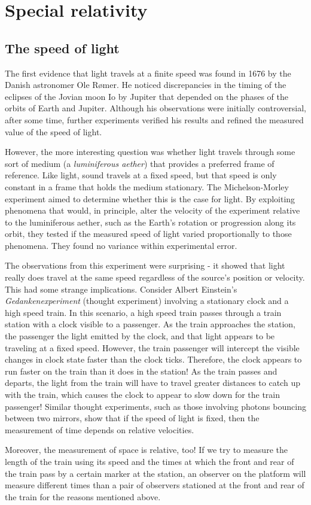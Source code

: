 \chapter{Special relativity}

\section{The speed of light}

The first evidence that light travels at a finite speed was found in 1676 by the Danish astronomer
Ole Rømer. He noticed discrepancies in the timing of the eclipses of the Jovian moon Io by Jupiter
that depended on the phases of the orbits of Earth and Jupiter. Although his observations were
initially controversial, after some time, further experiments verified his results and refined the
measured value of the speed of light.

However, the more interesting question was whether light travels through some sort of medium (a
\textit{luminiferous aether}) that provides a preferred frame of reference. Like light, sound
travels at a fixed speed, but that speed is only constant in a frame that holds the medium
stationary. The Michelson-Morley experiment aimed to determine whether this is the case for light.
By exploiting phenomena that would, in principle, alter the velocity of the experiment relative to
the luminiferous aether, such as the Earth's rotation or progression along its orbit, they tested
if the measured speed of light varied proportionally to those phenomena. They found no variance
within experimental error.

The observations from this experiment were surprising - it showed that light really does travel at
the same speed regardless of the source's position or velocity. This had some strange implications.
Consider Albert Einstein's \textit{Gedankenexperiment} (thought experiment) involving a stationary
clock and a high speed train. In this scenario, a high speed train passes through a train station
with a clock visible to a passenger. As the train approaches the station, the passenger the light
emitted by the clock, and that light appears to be traveling at a fixed speed. However, the train
passenger will intercept the visible changes in clock state faster than the clock ticks. Therefore,
the clock appears to run faster on the train than it does in the station! As the train passes and
departs, the light from the train will have to travel greater distances to catch up with the train,
which causes the clock to appear to slow down for the train passenger! Similar thought experiments,
such as those involving photons bouncing between two mirrors, show that if the speed of light is
fixed, then the measurement of time depends on relative velocities.

Moreover, the measurement of space is relative, too! If we try to measure the length of the train
using its speed and the times at which the front and rear of the train pass by a certain marker at
the station, an observer on the platform will measure different times than a pair of observers
stationed at the front and rear of the train for the reasons mentioned above.
